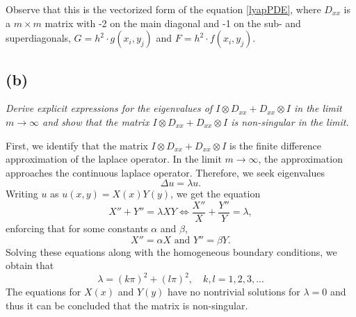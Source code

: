 Observe that this is the vectorized form of the equation \eqref{lyapPDE}, where
$D_{xx}$ is a $m\times m$ matrix with -2 on the main diagonal and -1 on the sub- and superdiagonals, $G =h^2\cdot g(x_i,y_j)$ and $F = h^2\cdot f(x_i,y_j)$.
\subsection*{(b)}
\emph{Derive explicit expressions for the eigenvalues of $I\otimes D_{xx}+D_{xx}\otimes I$ in the limit $m\to\infty$ and show that the matrix $I\otimes D_{xx}+D_{xx}\otimes I$ is non-singular in the limit.}

First, we identify that the matrix $I\otimes D_{xx}+D_{xx}\otimes I$ is the finite difference approximation of the laplace operator. In the limit $m\to\infty$, the approximation approaches the continuous laplace operator. Therefore, we seek eigenvalues
\begin{equation}
\Delta u = \lambda u.
\end{equation}
Writing $u$ as $u(x,y) = X(x)Y(y)$, we get the equation
\begin{equation}
X''+Y'' = \lambda XY \Leftrightarrow \frac{X''}{X}+\frac{Y''}{Y} = \lambda,
\end{equation}
enforcing that for some constants $\alpha$ and $\beta$,
\begin{equation}
X''=\alpha X\text{ and }Y'' = \beta Y.
\end{equation}
Solving these equations along with the homogeneous boundary conditions, we obtain that
\begin{equation}
\lambda = (k\pi)^2+(l\pi)^2,\quad k,l = 1,2,3,...
\end{equation}
The equations for $X(x)$ and $Y(y)$ have no nontrivial solutions for $\lambda =0$ and thus it can be concluded that the matrix is non-singular.
